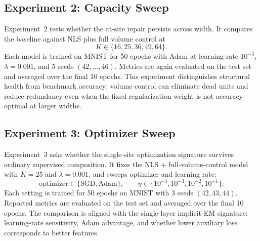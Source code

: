 \subsection{Experiment 2: Capacity Sweep}
Experiment~2 tests whether the at-site repair persists across width. It
compares the baseline against NLS plus full volume control at
\[
    K \in \{16,25,36,49,64\}.
\]
Each model is trained on MNIST for 50 epochs with Adam at learning rate
$10^{-3}$, $\lambda=0.001$, and 5 seeds $(42,\ldots,46)$. Metrics are again
evaluated on the test set and averaged over the final 10 epochs. This
experiment distinguishes structural health from benchmark accuracy: volume
control can eliminate dead units and reduce redundancy even when the fixed
regularization weight is not accuracy-optimal at larger widths.

\subsection{Experiment 3: Optimizer Sweep}
Experiment~3 asks whether the single-site optimization signature survives
ordinary supervised composition. It fixes the NLS + full-volume-control model
with $K=25$ and $\lambda=0.001$, and sweeps optimizer and learning rate:
\[
    \text{optimizer} \in \{\mathrm{SGD},\mathrm{Adam}\},
    \qquad
    \eta \in \{10^{-4},10^{-3},10^{-2},10^{-1}\}.
\]
Each setting is trained for 50 epochs on MNIST with 3 seeds $(42,43,44)$.
Reported metrics are evaluated on the test set and averaged over the final 10
epochs. The comparison is aligned with the single-layer implicit-EM signature:
learning-rate sensitivity, Adam advantage, and whether lower auxiliary loss
corresponds to better features.

